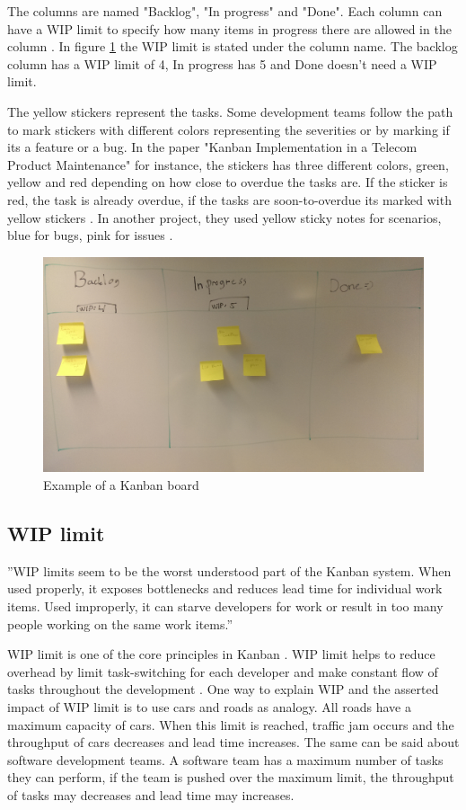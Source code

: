 \documentclass[UKenglish]{ifimaster}  %
\begin{document}
The columns are named "Backlog", "In progress" and "Done".  Each column can have a WIP limit to specify how many items in progress there are allowed in the column \parencite{Joyce}. In figure \ref{kanban_board} the WIP limit is stated under the column name. The backlog column has a WIP limit of 4, In progress has 5 and Done doesn't need a WIP limit. 

The yellow stickers represent the tasks. Some development teams follow the path to mark stickers with different colors representing the severities or by marking if its a feature or a bug. In the paper "Kanban Implementation in a Telecom Product Maintenance" for instance, the stickers has three different colors, green, yellow and red depending on how close to overdue the tasks are. If the sticker is red, the task is already overdue, if the tasks are soon-to-overdue its marked with yellow stickers \parencite{6068363}. In another project, they used yellow sticky notes for scenarios, blue for bugs, pink for issues \parencite{Shinkle}.
\begin{figure}[!htbp]
\centering
\includegraphics[width=\textwidth]{Picture/kanban_board.jpg}
\caption{Example of a Kanban board}
\label{kanban_board}
\end{figure}

\subsection{WIP limit}
\label{WIPsec}
''WIP limits seem to be the worst understood part of the Kanban system. When used properly, it exposes bottlenecks and reduces lead time for individual work items. Used improperly, it can starve developers for work or result in too many people working on the same work items.'' \parencite{Shinkle}

WIP limit is one of the core principles in Kanban \parencite{6068363}. WIP limit helps to reduce overhead by limit task-switching for each developer and make constant flow of tasks throughout the development \parencite{DavidAnderson}. One way to explain WIP and the asserted impact of WIP limit is to use cars and roads as analogy. All roads have a maximum capacity of cars. When this limit is reached, traffic jam occurs and the throughput of cars decreases and lead time increases. The same can be said about software development teams. A software team has a maximum number of tasks they can perform, if the team is pushed over the maximum limit, the throughput of tasks may decreases and lead time may increases.
\end{document}
